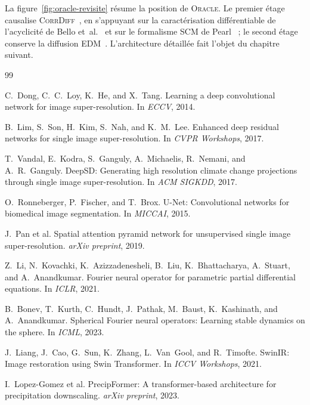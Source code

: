 \documentclass[14pt,a4paper,openany]{extreport}
\newcommand{\Oracle}{\textsc{Oracle}}
\newcommand{\CorrDiff}{\textsc{CorrDiff}}
\begin{document}
La figure~\ref{fig:oracle-revisite} résume la position de \Oracle{}. Le premier étage causalise \CorrDiff{}~\cite{mardani_corrdiff_2023}, en s'appuyant sur la caractérisation différentiable de l'acyclicité de Bello et~al.~\cite{bello_dagma_2022} et sur le formalisme SCM de Pearl~\cite{pearl_causality_2009} ; le second étage conserve la diffusion EDM~\cite{karras_edm_2022}. L'architecture détaillée fait l'objet du chapitre suivant.

\begin{thebibliography}{99}

 C.~Dong, C.~C.~Loy, K.~He, and X.~Tang. Learning a deep convolutional network for image super-resolution. In \emph{ECCV}, 2014.

 B.~Lim, S.~Son, H.~Kim, S.~Nah, and K.~M.~Lee. Enhanced deep residual networks for single image super-resolution. In \emph{CVPR Workshops}, 2017.

 T.~Vandal, E.~Kodra, S.~Ganguly, A.~Michaelis, R.~Nemani, and A.~R.~Ganguly. DeepSD: Generating high resolution climate change projections through single image super-resolution. In \emph{ACM SIGKDD}, 2017.

 O.~Ronneberger, P.~Fischer, and T.~Brox. U-Net: Convolutional networks for biomedical image segmentation. In \emph{MICCAI}, 2015.

 J.~Pan et al. Spatial attention pyramid network for unsupervised single image super-resolution. \emph{arXiv preprint}, 2019.

 Z.~Li, N.~Kovachki, K.~Azizzadenesheli, B.~Liu, K.~Bhattacharya, A.~Stuart, and A.~Anandkumar. Fourier neural operator for parametric partial differential equations. In \emph{ICLR}, 2021.

 B.~Bonev, T.~Kurth, C.~Hundt, J.~Pathak, M.~Baust, K.~Kashinath, and A.~Anandkumar. Spherical Fourier neural operators: Learning stable dynamics on the sphere. In \emph{ICML}, 2023.

 J.~Liang, J.~Cao, G.~Sun, K.~Zhang, L.~Van~Gool, and R.~Timofte. SwinIR: Image restoration using Swin Transformer. In \emph{ICCV Workshops}, 2021.

 I.~Lopez-Gomez et al. PrecipFormer: A transformer-based architecture for precipitation downscaling. \emph{arXiv preprint}, 2023.


\end{thebibliography}
\end{document}

